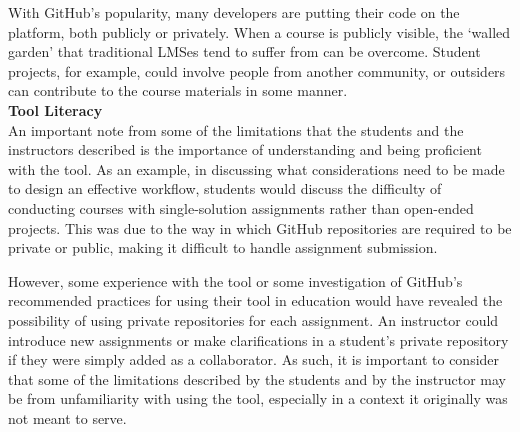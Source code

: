 With GitHub's popularity, many developers are putting their code on the platform, both publicly or privately. When a course is publicly visible, the `walled garden' that traditional LMSes tend to suffer from \cite{mott2010envisioning} can be overcome. Student projects, for example, could involve people from another community, or outsiders can contribute to the course materials in some manner. \\

\textbf{Tool Literacy} \\
An important note from some of the limitations that the students and the instructors described is the importance of understanding and being proficient with the tool. As an example, in discussing what considerations need to be made to design an effective workflow, students would discuss the difficulty of conducting courses with single-solution assignments rather than open-ended projects. This was due to the way in which GitHub repositories are required to be private or public, making it difficult to handle assignment submission.

However, some experience with the tool or some investigation of GitHub's recommended practices for using their tool in education would have revealed the possibility of using private repositories for each assignment. An instructor could introduce new assignments or make clarifications in a student's private repository if they were simply added as a collaborator. As such, it is important to consider that some of the limitations described by the students and by the instructor may be from unfamiliarity with using the tool, especially in a context it originally was not meant to serve.




